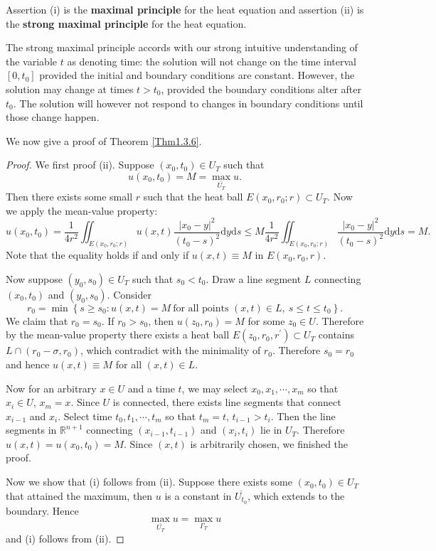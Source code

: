 Assertion (i) is the \textbf{maximal principle} for the heat equation and assertion (ii) is the \textbf{strong maximal principle} for the heat equation.\par
The strong maximal principle accords with our strong intuitive understanding of the variable $t$ as denoting time: the solution will not change on the time interval $[0,t_0]$ provided the initial and boundary conditions are constant. However, the solution may change at times $t>t_0$, provided the boundary conditions alter after $t_0$. The solution will however not respond to changes in boundary conditions until those change happen.\par
We now give a proof of Theorem \ref{Thm1.3.6}.
\begin{proof}
We first proof (ii). Suppose $(x_0,t_0)\in U_T$ such that 
$$
u\left( x_0,t_0 \right) =M=\max_{\overline{U_T}} u.
$$
Then there exists some small $r$ such that the heat ball $E(x_0,r_0;r)\subset U_T$. Now we apply the mean-value property: 
$$
u\left( x_0,t_0 \right) =\frac{1}{4r^2}\iint_{E\left( x_0,r_0;r \right)}{u\left( x,t \right) \frac{\left| x_0-y \right|^2}{\left( t_0-s \right) ^2}\mathrm{d}y\mathrm{d}s}\le M\frac{1}{4r^2}\iint_{E\left( x_0,r_0;r \right)}{\frac{\left| x_0-y \right|^2}{\left( t_0-s \right) ^2}\mathrm{d}y\mathrm{d}s}=M.
$$
Note that the equality holds if and only if $u(x,t)\equiv M$ in $E(x_0,r_0,r)$.\par
Now suppose $(y_0,s_0)\in U_T$ such that $s_0<t_0$. Draw a line segment $L$ connecting $(x_0,t_0)$ and $(y_0,s_0)$. Consider 
$$
r_0=\min \left\{ s\ge s_0:u\left( x,t \right) =M \ \text{for all points $(x,t)\in L$},\ s\le t\le t_0\right\}. 
$$
We claim that $r_0=s_0$. If $r_0>s_0$, then $u(z_0,r_0)=M$ for some $z_0\in U$. Therefore by the mean-value property there exists a heat ball $E(z_0,r_0,r^\prime)\subset U_T$ contains $L\cap(r_0-\sigma,r_0)$, which contradict with the minimality of $r_0$. Therefore $s_0=r_0$ and hence $u(x,t)\equiv M$ for all $(x,t)\in L$.\par
Now for an arbitrary $x\in U$ and a time $t$, we may select $x_0,x_1,\cdots,x_m$ so that $x_i\in U$, $x_m=x$. Since $U$ is connected, there exists line segments that connect $x_{i-1}$ and $x_i$. Select time $t_0,t_1,\cdots,t_m$ so that $t_m=t$, $t_{i-1}>t_i$. Then the line segments in $\mathbb{R}^{n+1}$ connecting $(x_{i-1},t_{i-1})$ and $(x_i,t_i)$ lie in $U_T$. Therefore $u(x,t)=u(x_0,t_0)=M$. Since $(x,t)$ is arbitrarily chosen, we finished the proof.\par
Now we show that (i) follows from (ii). Suppose there exists some $(x_0,t_0)\in U_T$ that attained the maximum, then $u$ is a constant in $\overline{U_{t_0}}$, which extends to the boundary. Hence 
$$
\max_{\overline{U_T}} u=\max_{\Gamma _T} u
$$
and (i) follows from (ii).
\end{proof}
